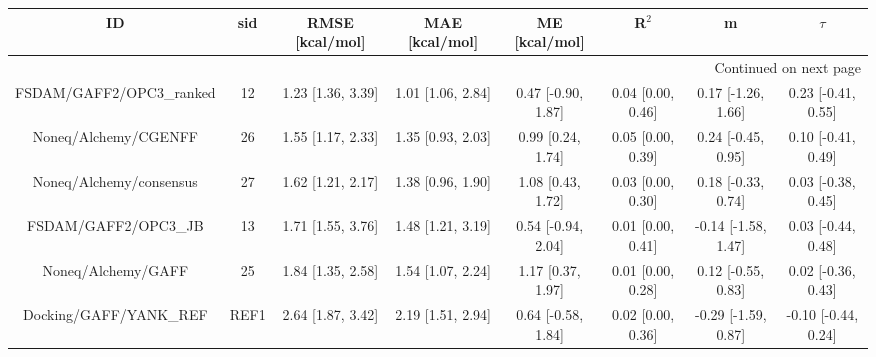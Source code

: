 \documentclass[8pt]{article}
\begin{document}
\begin{center}
\begin{footnotesize}
\begin{longtable}{|cccccccc|}
\toprule
                       ID &   sid &    RMSE [kcal/mol] &     MAE [kcal/mol] &       ME [kcal/mol] &              R$^2$ &                    m &               $\tau$ \\
\midrule
\endhead
\midrule
\multicolumn{8}{r}{{Continued on next page}} \\
\midrule
\endfoot

\bottomrule
\endlastfoot
 FSDAM/GAFF2/OPC3\_ranked &    12 &  1.23 [1.36, 3.39] &  1.01 [1.06, 2.84] &  0.47 [-0.90, 1.87] &  0.04 [0.00, 0.46] &   0.17 [-1.26, 1.66] &   0.23 [-0.41, 0.55] \\
     Noneq/Alchemy/CGENFF &    26 &  1.55 [1.17, 2.33] &  1.35 [0.93, 2.03] &   0.99 [0.24, 1.74] &  0.05 [0.00, 0.39] &   0.24 [-0.45, 0.95] &   0.10 [-0.41, 0.49] \\
  Noneq/Alchemy/consensus &    27 &  1.62 [1.21, 2.17] &  1.38 [0.96, 1.90] &   1.08 [0.43, 1.72] &  0.03 [0.00, 0.30] &   0.18 [-0.33, 0.74] &   0.03 [-0.38, 0.45] \\
     FSDAM/GAFF2/OPC3\_JB &    13 &  1.71 [1.55, 3.76] &  1.48 [1.21, 3.19] &  0.54 [-0.94, 2.04] &  0.01 [0.00, 0.41] &  -0.14 [-1.58, 1.47] &   0.03 [-0.44, 0.48] \\
       Noneq/Alchemy/GAFF &    25 &  1.84 [1.35, 2.58] &  1.54 [1.07, 2.24] &   1.17 [0.37, 1.97] &  0.01 [0.00, 0.28] &   0.12 [-0.55, 0.83] &   0.02 [-0.36, 0.43] \\
   Docking/GAFF/YANK\_REF &  REF1 &  2.64 [1.87, 3.42] &  2.19 [1.51, 2.94] &  0.64 [-0.58, 1.84] &  0.02 [0.00, 0.36] &  -0.29 [-1.59, 0.87] &  -0.10 [-0.44, 0.24] \\
\end{longtable}
\end{footnotesize}
\end{center}
\end{document}
